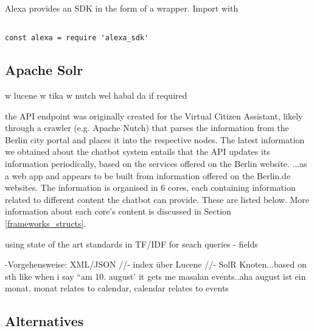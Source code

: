 Alexa provides an SDK in the form of a wrapper. Import with



\begin{verbatim}

const alexa = require 'alexa_sdk'
\end{verbatim}




\subsection*{Apache Solr}
\label{Solr}
w lucene w tika w nutch wel habal da if required

the API endpoint was originally created for the Virtual Citizen Assistant, likely through a crawler (e.g. Apache Nutch) that parses the information from the Berlin city portal and places it into the respective nodes. The latest information we obtained about the chatbot system entails that the API updates its information periodically, based on the services offered on the Berlin website. 
...as a web app and appears to be built from information offered on the Berlin.de websites. The information is organised in 6 cores, each containing information related to different content the chatbot can provide. These are listed below. More information about each core's content is discussed in Section \ref{frameworks_structs}.


using state of the art standards in TF/IDF for seach queries - fields

-Vorgehensweise: XML/JSON //- index über Lucene //- SolR Knoten...based on sth like when i say  ``am 10. august'  it gets me masalan events..aha august ist ein monat, monat relates to calendar, calendar relates to events





\subsection*{Alternatives}


